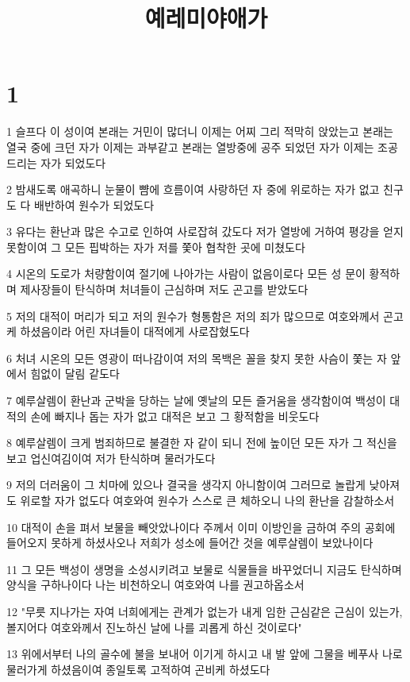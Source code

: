 

\title{예레미야애가}


\chapter{1}

\par 1 슬프다 이 성이여 본래는 거민이 많더니 이제는 어찌 그리 적막히 앉았는고 본래는 열국 중에 크던 자가 이제는 과부같고 본래는 열방중에 공주 되었던 자가 이제는 조공드리는 자가 되었도다
\par 2 밤새도록 애곡하니 눈물이 뺨에 흐름이여 사랑하던 자 중에 위로하는 자가 없고 친구도 다 배반하여 원수가 되었도다
\par 3 유다는 환난과 많은 수고로 인하여 사로잡혀 갔도다 저가 열방에 거하여 평강을 얻지 못함이여 그 모든 핍박하는 자가 저를 쫓아 협착한 곳에 미쳤도다
\par 4 시온의 도로가 처량함이여 절기에 나아가는 사람이 없음이로다 모든 성 문이 황적하며 제사장들이 탄식하며 처녀들이 근심하며 저도 곤고를 받았도다
\par 5 저의 대적이 머리가 되고 저의 원수가 형통함은 저의 죄가 많으므로 여호와께서 곤고케 하셨음이라 어린 자녀들이 대적에게 사로잡혔도다
\par 6 처녀 시온의 모든 영광이 떠나감이여 저의 목백은 꼴을 찾지 못한 사슴이 쫓는 자 앞에서 힘없이 달림 같도다
\par 7 예루살렘이 환난과 군박을 당하는 날에 옛날의 모든 즐거움을 생각함이여 백성이 대적의 손에 빠지나 돕는 자가 없고 대적은 보고 그 황적함을 비웃도다
\par 8 예루살렘이 크게 범죄하므로 불결한 자 같이 되니 전에 높이던 모든 자가 그 적신을 보고 업신여김이여 저가 탄식하며 물러가도다
\par 9 저의 더러움이 그 치마에 있으나 결국을 생각지 아니함이여 그러므로 놀랍게 낮아져도 위로할 자가 없도다 여호와여 원수가 스스로 큰 체하오니 나의 환난을 감찰하소서
\par 10 대적이 손을 펴서 보물을 빼앗았나이다 주께서 이미 이방인을 금하여 주의 공회에 들어오지 못하게 하셨사오나 저희가 성소에 들어간 것을 예루살렘이 보았나이다
\par 11 그 모든 백성이 생명을 소성시키려고 보물로 식물들을 바꾸었더니 지금도 탄식하며 양식을 구하나이다 나는 비천하오니 여호와여 나를 권고하옵소서
\par 12 "무릇 지나가는 자여 너희에게는 관계가 없는가 내게 임한 근심같은 근심이 있는가, 볼지어다 여호와께서 진노하신 날에 나를 괴롭게 하신 것이로다"
\par 13 위에서부터 나의 골수에 불을 보내어 이기게 하시고 내 발 앞에 그물을 베푸사 나로 물러가게 하셨음이여 종일토록 고적하여 곤비케 하셨도다
